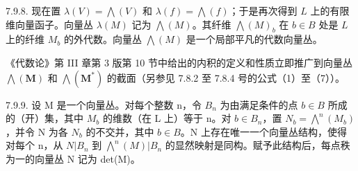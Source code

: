 7.9.8. 现在置 \(\lambda(V) = \bigwedge(V)\) 和 \(\lambda(f) = \bigwedge(f)\)；于是再次得到 \(L\) 上的有限维向量函子。向量丛 \(\lambda(M)\) 记为 \(\bigwedge(M)\)。其纤维 \(\bigwedge(M)_b\) 在 \(b \in B\) 处是 \(L\) 上的纤维 \(M_b\) 的外代数。向量丛 \(\bigwedge(M)\) 是一个局部平凡的代数向量丛。

《代数论》第 III 章第 3 版第 10 节中给出的内积的定义和性质立即推广到向量丛 \(\bigwedge(\mathbf{M})\) 和 \(\bigwedge(\mathbf{M}^{*})\) 的截面（另参见 7.8.2 至 7.8.4 号的公式（1）至（7））。

7.9.9. 设 M 是一个向量丛。对每个整数 n，令 \(B_{n}\) 为由满足条件的点 \(b \in B\) 所成的（开）集，其中 \(M_{b}\) 的维数（在 L 上）等于 n。对 \(b \in B_{n}\)，置 \(N_{b} = \bigwedge^{n}(M_{b})\)，并令 N 为各 \(N_{b}\) 的不交并，其中 \(b \in B\)。N 上存在唯一一个向量丛结构，使得对每个 n，从 \(N|B_{n}\) 到 \(\bigwedge^{n}(M)|B_{n}\) 的显然映射是同构。赋予此结构后，每点秩为一的向量丛 N 记为 det(M)。

